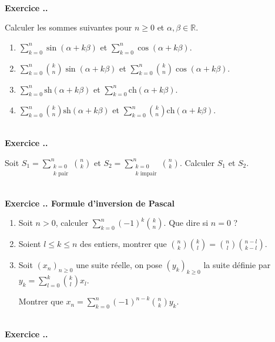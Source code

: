\documentclass{article}
\newcommand{\mb}[1]{\mathbb{#1}}
\newcounter{exo}
\newcommand{\exercice}[1][\null]{\textbf{\\ \large Exercice \thesection.\theexo. \normalsize #1} \addtocounter{exo}{1}}
\begin{document}
\exercice Calculer les sommes suivantes pour $n \ge 0$ et $\alpha, \beta \in \mb{R}$.

\begin{enumerate}

\item $\displaystyle \sum_{k=0}^n \sin(\alpha + k\beta)$ et $\displaystyle \sum_{k=0}^n \cos(\alpha + k\beta)$. 

\item $\displaystyle \sum_{k=0}^n {k \choose n} \sin(\alpha + k\beta)$ et $\displaystyle \sum_{k=0}^n {k \choose n} \cos(\alpha + k\beta)$.

\item $\displaystyle \sum_{k=0}^n \text{sh}(\alpha + k\beta)$ et $\displaystyle \sum_{k=0}^n \text{ch}(\alpha + k\beta)$. 

\item $\displaystyle \sum_{k=0}^n {k \choose n} \text{sh}(\alpha + k\beta)$ et $\displaystyle \sum_{k=0}^n {k \choose n} \text{ch}(\alpha + k\beta)$.

\end{enumerate}

\exercice

Soit $\displaystyle S_1 = \sum_{\substack{k=0 \\ k \text{ pair}}}^n {n \choose k}$ et $\displaystyle S_2 = \sum_{\substack{k=0 \\ k \text{ impair}}}^n {n \choose k}$. Calculer $S_1$ et $S_2$.

\exercice[Formule d'inversion de Pascal]

\begin{enumerate}

\item Soit $n > 0$, calculer $\displaystyle \sum_{k=0}^n (-1)^k {k \choose n}$. Que dire si $n = 0$ ?

\item Soient $l \le k \le n$ des entiers, montrer que $\displaystyle {n \choose k} {k \choose l} = {n \choose l} {n-l \choose k-l} $.

\item Soit $(x_n)_{n \ge 0}$ une suite réelle, on pose $(y_k)_{k \ge 0}$ la suite définie par $\displaystyle y_k = \sum_{l=0}^k {k \choose l} x_l$.

Montrer que $\displaystyle x_n = \sum_{k=0}^n (-1)^{n-k} {n \choose k} y_k$.

\end{enumerate}


\exercice
\end{document}
